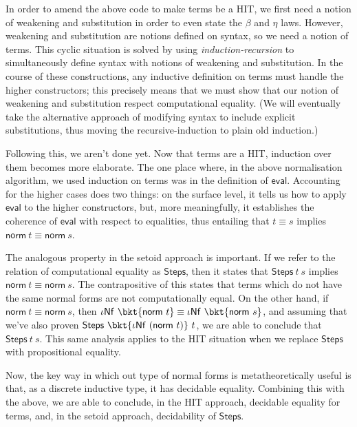 In order to amend the above code to make terms be a HIT, we first need a notion
of weakening and substitution in order to even state the $\beta$ and $\eta$
laws. However, weakening and substitution are notions defined on syntax, so we
need a notion of terms. This cyclic situation is solved by using
\emph{induction-recursion} to simultaneously define syntax with notions of
weakening and substitution. In the course of these constructions, any inductive
definition on terms must handle the higher constructors; this precisely means
that we must show that our notion of weakening and substitution respect
computational equality. (We will eventually take the alternative approach of
modifying syntax to include explicit substitutions, thus moving the
recursive-induction to plain old induction.)

Following this, we aren't done yet. Now that terms are a HIT, induction over
them becomes more elaborate. The one place where, in the above normalisation
algorithm, we used induction on terms was in the definition of $\mathsf{eval}$.
Accounting for the higher cases does two things: on the surface level, it
tells us how to apply $\mathsf{eval}$ to the higher constructors, but, more
meaningfully, it establishes the coherence of $\mathsf{eval}$ with respect
to equalities, thus entailing that $t \equiv s$ implies $\mathsf{norm}~t \equiv
\mathsf{norm}~s$.

The analogous property in the setoid approach is important. If we refer to the
relation of computational equality as $\mathsf{Steps}$, then it states that
$\mathsf{Steps}~t~s$ implies $\mathsf{norm}~t \equiv \mathsf{norm}~s$. The
contrapositive of this states that terms which do not have the same normal forms
are not computationally equal. On the other hand, if $\mathsf{norm}~t \equiv
\mathsf{norm}~s$, then $\iota\mathsf{Nf}~\bkt{\mathsf{norm}~t} \equiv
\iota\mathsf{Nf}~\bkt{\mathsf{norm}~s}$, and assuming that we've also proven
$\mathsf{Steps}~\bkt{\iota\mathsf{Nf}~(\mathsf{norm}~t)}~t$, we are able to
conclude that $\mathsf{Steps}~t~s$. This same analysis applies to the HIT
situation when we replace $\mathsf{Steps}$ with propositional equality.

Now, the key way in which out type of normal forms is metatheoretically useful
is that, as a discrete inductive type, it has decidable equality. Combining
this with the above, we are able to conclude, in the HIT approach, decidable
equality for terms, and, in the setoid approach, decidability of
$\mathsf{Steps}$.

